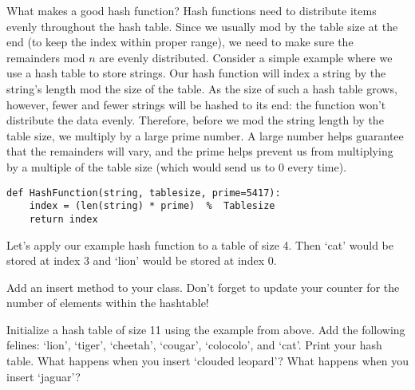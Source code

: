 What makes a good hash function?
Hash functions need to distribute items evenly throughout the hash table.
Since we usually mod by the table size at the end (to keep the index within proper range), we need to make sure the remainders mod $n$ are evenly distributed.
Consider a simple example where we use a hash table to store strings.
Our hash function will index a string by the string's length mod the size of the table.
As the size of such a hash table grows, however,  fewer and fewer strings will be hashed to its end: the function won't distribute the data evenly.
Therefore, before we mod the string length by the table size, we multiply by a large prime number.
A large number helps guarantee that the remainders will vary, and the prime helps prevent us from multiplying by a multiple of the table size (which would send us to $0$ every time).
\begin{lstlisting}
def HashFunction(string, tablesize, prime=5417):
    index = (len(string) * prime)  %  Tablesize
    return index
\end{lstlisting}
Let's apply our example hash function to a table of size 4.
Then `cat' would be stored at index $3$ and `lion' would be stored at index $0$.
\begin{center}
\end{center}
\begin{problem}
Add an insert method to your  class. Don't forget to update your counter for the number of elements within the hashtable!

Initialize a hash table of size 11 using the example  from above.
Add the following felines: `lion', `tiger', `cheetah', `cougar', `colocolo', and `cat'.
Print your hash table. What happens when you insert `clouded leopard'?
What happens when you insert `jaguar'?
\label{Prob:Basic hash insert}
\end{problem}

